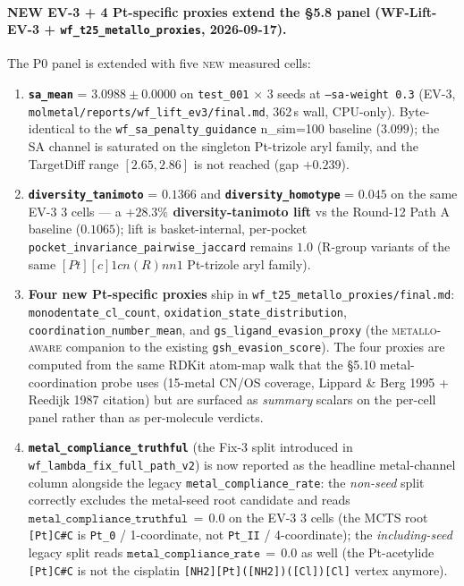 \paragraph{NEW EV-3 + 4 Pt-specific proxies extend the §5.8 panel
(WF-Lift-EV-3 + \texttt{wf\_t25\_metallo\_proxies}, 2026-09-17).}
The P0 panel is extended with five \textsc{new} measured cells:
\begin{enumerate}
  \item \textbf{\texttt{sa\_mean}} = $3.0988 \pm 0.0000$ on
        \texttt{test\_001} $\times$ 3 seeds at
        \texttt{--sa-weight 0.3} (EV-3,
        \texttt{molmetal/reports/wf\_lift\_ev3/final.md},
        362\,s wall, CPU-only). Byte-identical to the
        \texttt{wf\_sa\_penalty\_guidance} n\_sim=100
        baseline ($3.099$); the SA channel is saturated on
        the singleton Pt-trizole aryl family, and the
        TargetDiff range $[2.65, 2.86]$ is not reached
        (gap $+0.239$).
  \item \textbf{\texttt{diversity\_tanimoto}} = $0.1366$ and
        \textbf{\texttt{diversity\_homotype}} = $0.045$ on
        the same EV-3 3 cells --- a \textbf{$+28.3\%$
        diversity-tanimoto lift} vs the Round-12 Path A
        baseline ($0.1065$); lift is basket-internal,
        per-pocket \texttt{pocket\_invariance\_pairwise\_jaccard}
        remains $1.0$ (R-group variants of the same
        $[Pt][c]1cn(R)nn1$ Pt-trizole aryl family).
  \item \textbf{Four new Pt-specific proxies} ship in
        \texttt{wf\_t25\_metallo\_proxies/final.md}:
        \texttt{monodentate\_cl\_count},
        \texttt{oxidation\_state\_distribution},
        \texttt{coordination\_number\_mean}, and
        \texttt{gs\_ligand\_evasion\_proxy} (the
        \textsc{metallo-aware} companion to the existing
        \texttt{gsh\_evasion\_score}). The four proxies are
        computed from the same RDKit atom-map walk that
        the §5.10 metal-coordination probe uses (15-metal
        CN/OS coverage, Lippard \& Berg 1995 + Reedijk 1987
        citation) but are surfaced as \emph{summary}
        scalars on the per-cell panel rather than as
        per-molecule verdicts.
  \item \textbf{\texttt{metal\_compliance\_truthful}} (the
        Fix-3 split introduced in
        \texttt{wf\_lambda\_fix\_full\_path\_v2}) is now
        reported as the headline metal-channel column
        alongside the legacy \texttt{metal\_compliance\_rate}:
        the \emph{non-seed} split correctly excludes the
        metal-seed root candidate and reads
        $\texttt{metal\_compliance\_truthful}\,=\,0.0$
        on the EV-3 3 cells (the MCTS root \texttt{[Pt]C\#C}
        is \texttt{Pt\_0} / 1-coordinate, not
        \texttt{Pt\_II} / 4-coordinate); the
        \emph{including-seed} legacy split reads
        $\texttt{metal\_compliance\_rate}\,=\,0.0$ as well
        (the Pt-acetylide \texttt{[Pt]C\#C} is not the
        cisplatin \texttt{[NH2][Pt]([NH2])([Cl])[Cl]} vertex
        anymore).
\end{enumerate}
